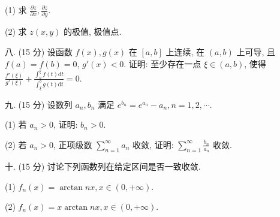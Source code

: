 \documentclass{examcollection}
\begin{document}
{\begin{minipage}{\textwidth}
(1) 求  $\frac{\partial z}{\partial x}, \frac{\partial z}{\partial y}.$\par
(2) 求  $z(x,y)$  的极值, 极值点.\par
八. (15 分) 设函数 $f(x), g(x)$ 在 $[a, b]$ 上连续, 在 $(a, b)$ 上可导, 且 $f(a) = f(b) = 0$, $g'(x) < 0$. 证明: 至少存在一点 $\xi \in (a, b)$, 使得 $\frac{f'(\xi)}{g'(\xi)} + \frac{\int_a^\xi f(t) \mathrm{d}t}{\int_\xi^b g(t) \mathrm{d}t} = 0$.\par
九. (15 分) 设数列 $a_{n}, b_{n}$ 满足 $e^{b_{n}} = e^{a_{n}} - a_{n}, n = 1, 2, \cdots$.\par
(1) 若 $a_{n} > 0$, 证明: $b_{n} > 0$.\par
(2) 若 $a_{n} > 0$, 正项级数 $\sum_{n=1}^{\infty} a_{n}$ 收敛, 证明: $\sum_{n=1}^{\infty} \frac{b_{n}}{a_{n}}$ 收敛.\par
十. (15 分) 讨论下列函数列在给定区间是否一致收敛.\par
(1) $f_{n}(x) = \arctan nx, x \in (0, +\infty)$.\par
(2) $f_{n}(x) = x\arctan nx, x\in (0, + \infty).$\par
\end{minipage}}
\ifdim\dimexpr\ht\proofbox+\dp\proofbox\relax>\textheight
\noindent\resizebox{!}{\textheight}{\usebox{\proofbox}}\else\noindent\usebox{\proofbox}\fi\clearpage
\end{document}
